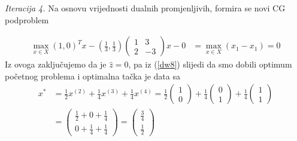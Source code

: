 \documentclass[a4paper, utf8, 11pt, colorlinks]{book}
\theoremstyle{definition}
\begin{document}
\vspace{5mm}

\emph{Iteracija 4.} Na osnovu vrijednosti dualnih promjenljivih, formira se novi CG podproblem
 
	 \begin{align*}
		\max_{x \in X} (1, 0)^T x - (\frac{1}{3}, \frac{1}{3})\left(\begin{array}{cc}
			1 & 3 \\
			2 & -3
		\end{array}\right)  x   - 0 &= \max_{x \in X} (x_1  - x_1 ) = 0    
	\end{align*} 
  Iz ovoga zaključujemo da je $\hat{z}=0$, pa iz (\ref{dw8}) slijedi da smo dobili optimum početnog problema i optimalna tačka je data sa 
\begin{align*}
  	 x^* &= \frac{1}{2}  x^{(2)}+ \frac{1}{4} x^{(3)} + \frac{1}{4} x^{(4)} 
  	     = \frac{1}{2} \begin{pmatrix}
  	     	      1 \\
  	     	      0
  	     \end{pmatrix} +
       \frac{1}{4} \begin{pmatrix}
       	                  0 \\
       	                  1
       \end{pmatrix} +
   \frac{1}{4} \begin{pmatrix}
   	                  1 \\
   	                  1
   \end{pmatrix}\\
   &= \begin{pmatrix}
   	        \frac{1}{2} + 0 + \frac{1}{4} \\
   	        0 + \frac{1}{4} + \frac{1}{4}
   \end{pmatrix} = \begin{pmatrix}
         \frac{3}{4} \\
         \frac{1}{2}
  \end{pmatrix}
\end{align*}
\vspace{1cm} \\
\end{document}
